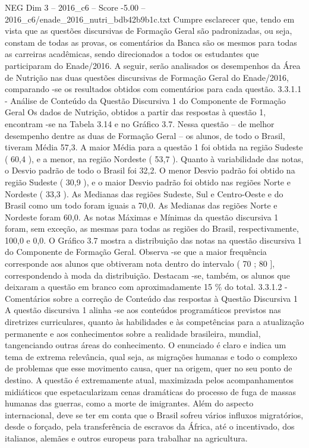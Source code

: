 \begin{textsample}{NEG Dim 3 – 2016\_c6 – Score -5.00 – 2016\_c6/enade\_2016\_nutri\_bdb42b9b1c.txt}
Cumpre esclarecer que, tendo em vista que as questões discursivas de Formação Geral são padronizadas, ou seja, constam de todas as provas, os comentários da Banca são os mesmos para todas as carreiras acadêmicas, sendo direcionados a todos os estudantes que participaram do Enade/2016.
A seguir, serão analisados os desempenhos da Área de Nutrição nas duas questões discursivas de Formação Geral do Enade/2016, comparando -se os resultados obtidos com comentários para cada questão. 3.3.1.1 - Análise de Conteúdo da Questão Discursiva 1 do Componente de Formação Geral Os dados de Nutrição, obtidos a partir das respostas à questão 1, encontram -se na Tabela 3.14 e no Gráfico 3.7.
Nessa questão – de melhor desempenho dentre as duas de Formação Geral – os alunos, de todo o Brasil, tiveram Média 57,3.
A maior Média para a questão 1 foi obtida na região Sudeste ( 60,4 ), e a menor, na região Nordeste ( 53,7 ).
Quanto à variabilidade das notas, o Desvio padrão de todo o Brasil foi 32,2.
O menor Desvio padrão foi obtido na região Sudeste ( 30,9 ), e o maior Desvio padrão foi obtido nas regiões Norte e Nordeste ( 33,3 ).
As Medianas das regiões Sudeste, Sul e Centro-Oeste e do Brasil como um todo foram iguais a 70,0.
As Medianas das regiões Norte e Nordeste foram 60,0.
As notas Máximas e Mínimas da questão discursiva 1 foram, sem exceção, as mesmas para todas as regiões do Brasil, respectivamente, 100,0 e 0,0.
O Gráfico 3.7 mostra a distribuição das notas na questão discursiva 1 do Componente de Formação Geral.
Observa -se que a maior frequência corresponde aos alunos que obtiveram nota dentro do intervalo ( 70 ; 80 ], correspondendo à moda da distribuição.
Destacam -se, também, os alunos que deixaram a questão em branco com aproximadamente 15 \% do total. 3.3.1.2 - Comentários sobre a correção de Conteúdo das respostas à Questão Discursiva 1 A questão discursiva 1 alinha -se aos conteúdos programáticos previstos nas diretrizes curriculares, quanto às habilidades e às competências para a atualização permanente e aos conhecimentos sobre a realidade brasileira, mundial, tangenciando outras áreas do conhecimento.
O enunciado é claro e indica um tema de extrema relevância, qual seja, as migrações humanas e todo o complexo de problemas que esse movimento causa, quer na origem, quer no seu ponto de destino.
A questão é extremamente atual, maximizada pelos acompanhamentos midiáticos que espetacularizam cenas dramáticas do processo de fuga de massas humanas das guerras, como a morte de imigrantes.
Além do aspecto internacional, deve se ter em conta que o Brasil sofreu vários influxos migratórios, desde o forçado, pela transferência de escravos da África, até o incentivado, dos italianos, alemães e outros europeus para trabalhar na agricultura.

\end{textsample}
